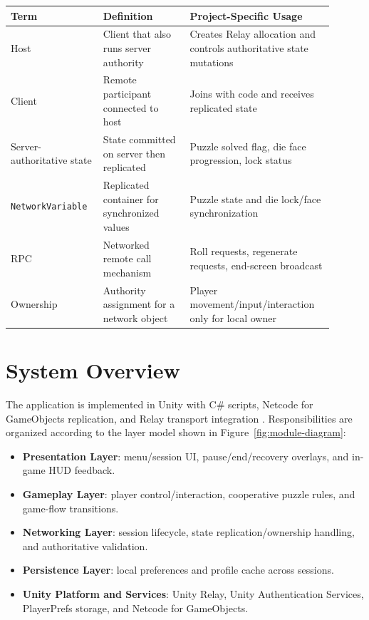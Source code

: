 \begin{table}[H]
\centering
\caption{Concepts and Definitions}
\label{tab:concept-definitions}
\begin{longtable}{|>{\centering\arraybackslash}m{0.25\linewidth}|>{\centering\arraybackslash}m{0.25\linewidth}|>{\centering\arraybackslash}m{0.4\linewidth}|}
\hline
\hline
\textbf{Term} & \textbf{Definition} & \textbf{Project-Specific Usage} \\
\hline
Host & Client that also runs server authority & Creates Relay allocation and controls authoritative state mutations \\
\hline
Client & Remote participant connected to host & Joins with code and receives replicated state \\
\hline
Server-authoritative state & State committed on server then replicated & Puzzle solved flag, die face progression, lock status \cite{unity_ngo_networkvariable_docs,unity_ngo_rpc_docs,unity_ngo_ownership_docs} \\
\hline
\texttt{NetworkVariable} & Replicated container for synchronized values & Puzzle state and die lock/face synchronization \cite{unity_ngo_networkvariable_docs} \\
\hline
RPC & Networked remote call mechanism & Roll requests, regenerate requests, end-screen broadcast \cite{unity_ngo_rpc_docs} \\
\hline
Ownership & Authority assignment for a network object & Player movement/input/interaction only for local owner \cite{unity_ngo_ownership_docs} \\
\hline
\end{longtable}
\addtocounter{table}{-1}
\end{table}

\section{System Overview}
The application is implemented in Unity with C\# scripts, Netcode for GameObjects replication, and Relay transport integration \cite{unity_ngo_networkvariable_docs,unity_ngo_rpc_docs,unity_relay_docs}. Responsibilities are organized according to the layer model shown in Figure~\ref{fig:module-diagram}:
\begin{itemize}
\item \textbf{Presentation Layer}: menu/session UI, pause/end/recovery overlays, and in-game HUD feedback.
\item \textbf{Gameplay Layer}: player control/interaction, cooperative puzzle rules, and game-flow transitions.
\item \textbf{Networking Layer}: session lifecycle, state replication/ownership handling, and authoritative validation.
\item \textbf{Persistence Layer}: local preferences and profile cache across sessions.
\item \textbf{Unity Platform and Services}: Unity Relay, Unity Authentication Services, PlayerPrefs storage, and Netcode for GameObjects.
\end{itemize}

